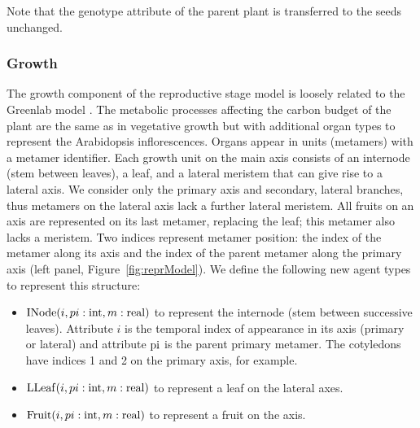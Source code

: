 Note that the genotype attribute of the parent plant is transferred to
the seeds unchanged.

\subsubsection*{Growth}
\label{growth-1}

The growth component of the reproductive stage model is loosely related to the
Greenlab model \citep{christophe_model-based_2008}. The metabolic processes
affecting the carbon budget of the plant are the same as in vegetative growth
but with additional organ types to represent the Arabidopsis
inflorescences. Organs appear in units (metamers) with a metamer
identifier. Each growth unit on the main axis consists of an internode (stem
between leaves), a leaf, and a lateral meristem that can give rise to a lateral
axis. We consider only the primary axis and secondary, lateral branches, thus
metamers on the lateral axis lack a further lateral meristem. All fruits on an
axis are represented on its last metamer, replacing the leaf; this metamer also
lacks a meristem.  Two indices represent metamer position: the index of the
metamer along its axis and the index of the parent metamer along the primary
axis (left panel, Figure~\ref{fig:reprModel}). We define the following new agent
types to represent this structure:

\begin{itemize}
\item
  \(\mathrm{INode}(i,pi:\mathrm{int},m:\mathrm{real})\) to represent the
  internode (stem between successive leaves). Attribute \(i\) is the
  temporal index of appearance in its axis (primary or lateral) and
  attribute \(\mathrm{pi}\) is the parent primary metamer. The cotyledons
  have indices 1 and 2 on the primary axis, for example.
\item
  \(\mathrm{LLeaf}(i,pi:\mathrm{int},m:\mathrm{real})\) to represent a leaf on
  the lateral axes.
\item
  \(\mathrm{Fruit}(i,pi:\mathrm{int},m:\mathrm{real})\) to represent a fruit
  on the axis.
\end{itemize}

